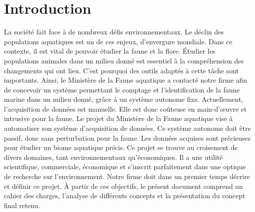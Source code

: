 
%
%

\chapter{Introduction}
\label{s:intro}

La société fait face à de nombreux défis environnementaux. Le déclin des populations aquatiques est un de ces enjeux, d’envergure mondiale.
Dans ce contexte, il est vital de pouvoir étudier la faune et la flore.
Étudier les populations animales dans un milieu donné est essentiel à la compréhension des changements qui ont lieu.
C’est pourquoi des outils adaptés à cette tâche sont importants.
\wl
Ainsi, le Ministère de la Faune aquatique a contacté notre firme afin de concevoir un système permettant le comptage et l’identification de la faune marine dans un milieu donné, grâce à un système autonome fixe.
Actuellement, l’acquisition de données est manuelle.
Elle est donc coûteuse en main-d’œuvre et intrusive pour la faune.
Le projet du Ministère de la Faune aquatique vise à automatiser son système d’acquisition de données.
Ce système autonome doit être passif, donc sans perturbation pour la faune.
Les données acquises sont précieuses pour étudier un biome aquatique précis.
\wl
Ce projet se trouve au croisement de divers domaines, tant environnementaux qu’économiques.
Il a une utilité scientifique, commerciale, économique et s’inscrit parfaitement dans une optique de recherche sur l’environnement.
\wl
Notre firme doit dans un premier temps décrire et définir ce projet.
À partir de ces objectifs, le présent document comprend un cahier des charges, l’analyse de différents concepts et la présentation du concept final retenu.